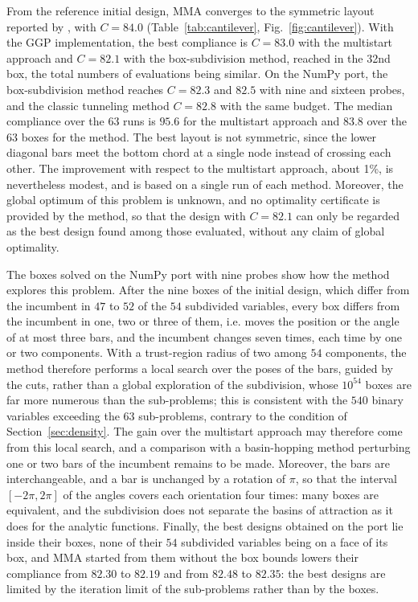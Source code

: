 \documentclass[pdflatex,sn-basic]{sn-jnl}
\begin{document}
From the reference initial design, MMA converges to the symmetric layout reported
by \citet{coniglio2020}, with $C = 84.0$ (Table~\ref{tab:cantilever},
Fig.~\ref{fig:cantilever}). With the GGP implementation, the best compliance is
$C = 83.0$ with the multistart approach and $C = 82.1$ with the box-subdivision
method, reached in the 32nd box, the total numbers of evaluations being
similar. On the NumPy port, the box-subdivision method reaches $C = 82.3$ and
$82.5$ with nine and sixteen probes, and the classic tunneling method $C = 82.8$
with the same budget. The median
compliance over the $63$ runs is $95.6$ for the multistart approach and $83.8$
over the $63$ boxes for the method. The best layout is not symmetric, since the
lower diagonal bars meet the bottom chord at a single node instead of crossing
each other. The improvement with respect to the multistart
approach, about 1\%, is nevertheless modest, and is based on a single run of each
method. Moreover, the global optimum of this problem is unknown, and no
optimality certificate is provided by the method, so that the design with
$C = 82.1$ can only be regarded as the best design found among those evaluated,
without any claim of global optimality.

The boxes solved on the NumPy port with nine probes show how the method explores
this problem. After the nine boxes of the initial design, which differ from the
incumbent in $47$ to $52$ of the $54$ subdivided variables, every box differs
from the incumbent in one, two or three of them, i.e. moves the position or the
angle of at most three bars, and the incumbent changes seven times, each time
by one or two components. With a trust-region radius of two among $54$
components, the method therefore performs a local search over the poses of the
bars, guided by the cuts, rather than a global exploration of the subdivision,
whose $10^{54}$ boxes are far more numerous than the sub-problems; this is
consistent with the $540$ binary variables exceeding the $63$ sub-problems,
contrary to the condition of Section~\ref{sec:density}. The gain over the
multistart approach may therefore come from this local search, and a comparison
with a basin-hopping method perturbing one or two bars of the incumbent remains
to be made. Moreover, the bars are interchangeable, and a bar is unchanged by a
rotation of $\pi$, so that the interval $[-2\pi, 2\pi]$ of the angles covers each
orientation four times: many boxes are equivalent, and the subdivision does not
separate the basins of attraction as it does for the analytic functions.
Finally, the best designs obtained on the port lie inside their boxes, none of
their $54$ subdivided variables being on a face of its box, and MMA started from
them without the box bounds lowers their compliance from $82.30$ to $82.19$ and
from $82.48$ to $82.35$: the best designs are limited by the iteration limit of
the sub-problems rather than by the boxes.
\end{document}
